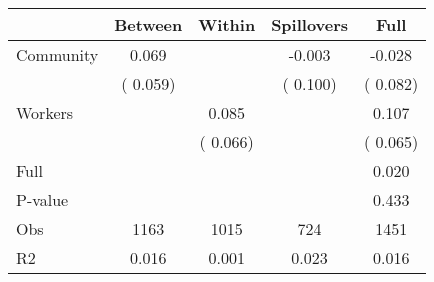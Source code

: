 
\begin{tabular}{l*{4}{c}}\hline&\multicolumn{1}{c}{Between}&\multicolumn{1}{c}{Within}&\multicolumn{1}{c}{Spillovers}&\multicolumn{1}{c}{Full}\\ \hline
 Community             &              0.069      &                                               &       -0.003 &        -0.028                            \\ 
                               &        (       0.059)           &                                       &       (       0.100)     &      (       0.082)                                           \\ 
 Workers       &                                               &        0.085    &                                &             0.107                            \\ 
                               &                                               & (       0.066)                  &                                        &      (       0.065)                                           \\ 
\hline                                                                                                                                                                                                                                            
 Full                  &                                               &                                               &                                        &             0.020                                     \\ 
 P-value               &                                               &                                               &                                        &             0.433                                           \\ 
 Obs                   &               1163               &       1015                       &       724                &              1451                                               \\ 
 R2                    &                      0.016              &              0.001                      &              0.023               &                     0.016                                              \\ 
\hline \end{tabular}                                                                                                                                                                                                              